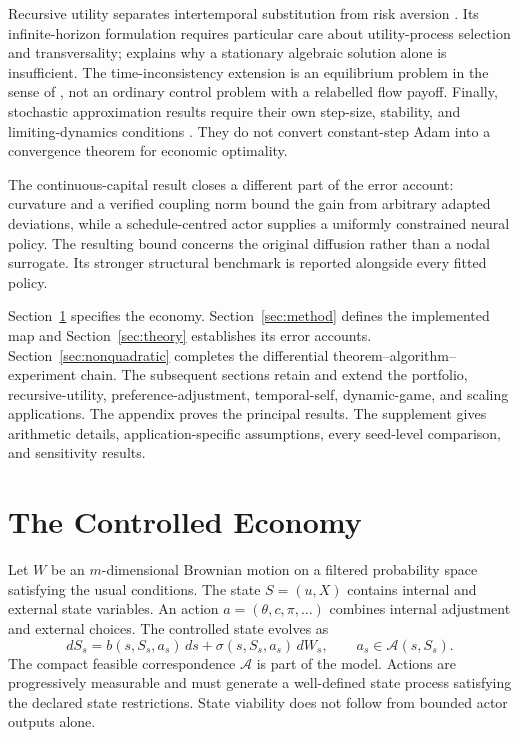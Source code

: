 \documentclass[ecta,draft]{econsocart}
\theoremstyle{definition}
\theoremstyle{remark}
\newcommand{\Act}{\mathcal A}
\begin{document}
Recursive utility separates intertemporal substitution from risk aversion \citep{epsteinzin1989,duffieepstein1992}. Its infinite-horizon formulation requires particular care about utility-process selection and transversality; \citet{herdegen2021} explains why a stationary algebraic solution alone is insufficient. The time-inconsistency extension is an equilibrium problem in the sense of \citet{bjork2016}, not an ordinary control problem with a relabelled flow payoff. Finally, stochastic approximation results require their own step-size, stability, and limiting-dynamics conditions \citep{borkar2024}. They do not convert constant-step Adam into a convergence theorem for economic optimality.

The continuous-capital result closes a different part of the error account: curvature and a verified coupling norm bound the gain from arbitrary adapted deviations, while a schedule-centred actor supplies a uniformly constrained neural policy. The resulting bound concerns the original diffusion rather than a nodal surrogate. Its stronger structural benchmark is reported alongside every fitted policy.

Section~\ref{sec:model} specifies the economy. Section~\ref{sec:method} defines the implemented map and Section~\ref{sec:theory} establishes its error accounts. Section~\ref{sec:nonquadratic} completes the differential theorem--algorithm--experiment chain. The subsequent sections retain and extend the portfolio, recursive-utility, preference-adjustment, temporal-self, dynamic-game, and scaling applications. The appendix proves the principal results. The supplement gives arithmetic details, application-specific assumptions, every seed-level comparison, and sensitivity results.

\section{The Controlled Economy}\label{sec:model}
Let $W$ be an $m$-dimensional Brownian motion on a filtered probability space satisfying the usual conditions. The state $S=(u,X)$ contains internal and external state variables. An action $a=(\theta,c,\pi,\ldots)$ combines internal adjustment and external choices. The controlled state evolves as
\begin{equation}\label{eq:state}
 dS_s=b(s,S_s,a_s)\,ds+\sigma(s,S_s,a_s)\,dW_s,
 \qquad a_s\in\Act(s,S_s).
\end{equation}
The compact feasible correspondence $\Act$ is part of the model. Actions are progressively measurable and must generate a well-defined state process satisfying the declared state restrictions. State viability does not follow from bounded actor outputs alone.
\end{document}
